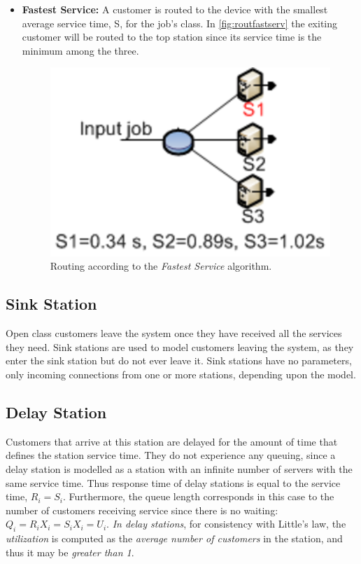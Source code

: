 \begin{itemize}
\item \textbf{Fastest Service:} A customer is routed to the device
with the smallest average service time, S, for the job's class. In
\autoref{fig:routfastserv} the exiting customer will be routed to
the top station since its service time is the minimum among the
three.
\begin{figure}[htb]
    \begin{center}
        \includegraphics[scale=.5]{img/jsimg/8.14.eps}
    \end{center}
    \caption{Routing according to the \emph{Fastest Service}
    algorithm.}
    \label{fig:routfastserv}
\end{figure}
\end{itemize}

\subsection{Sink Station} Open class customers leave the
system once they have received all the services they need. Sink
stations are used to model customers leaving the system, as they
enter the sink station but do not ever leave it. Sink stations
have no parameters, only incoming connections from one or more
stations, depending upon the model.

\subsection{Delay Station}
\label{dstat} Customers that arrive at this
station are delayed for the amount of time that defines the
station service time. They do not experience any queuing, since a
delay station is modelled as a station with an infinite number of
servers with the same service time. Thus response time of delay
stations is equal to the service time, $R_i = S_i$. Furthermore,
the queue length corresponds in this case to the number of
customers receiving service since there is no waiting: $Q_i = R_i
X_i = S_i X_i = U_i$. \emph{In delay stations}, for consistency
with Little's law, the \emph{utilization} is computed as the
\emph{average number of customers} in the station, and thus it may
be \emph{greater than 1}.

